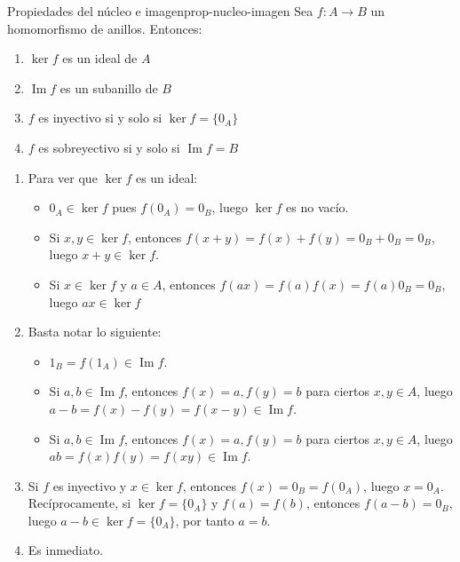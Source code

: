 \begin{proposition}{Propiedades del núcleo e imagen}{prop-nucleo-imagen}
    Sea \(f: A \to B\) un homomorfismo de anillos. Entonces:
    \begin{enumerate}
        \item \(\ker f\) es un ideal de \(A\)
        \item \(\operatorname{Im} f\) es un subanillo de \(B\)
        \item \(f\) es inyectivo si y solo si \(\ker f = \{0_A\}\)
        \item \(f\) es sobreyectivo si y solo si \(\operatorname{Im} f = B\)
    \end{enumerate}
\end{proposition}

\begin{proofbox}
    \begin{enumerate}
        \item Para ver que \(\ker f\) es un ideal:
        \begin{itemize}
            \item \(0_A \in \ker f\) pues \(f(0_A) = 0_B\), luego $\ker f$ es no vacío.
            \item Si \(x, y \in \ker f\), entonces \(f(x + y) = f(x) + f(y) = 0_B + 0_B = 0_B\), luego \(x + y \in \ker f\).
            \item Si \(x \in \ker f\) y \(a \in A\), entonces \(f(ax) = f(a)f(x) = f(a) 0_B = 0_B\), luego \(ax \in \ker f\)
        \end{itemize}
        
        \item Basta notar lo siguiente:
        \begin{itemize}
            \item \(1_B = f(1_A) \in \operatorname{Im} f\).
            \item Si \(a, b \in \operatorname{Im} f\), entonces \(f(x) = a, f(y) = b\) para ciertos $x,y \in A$, luego \(a - b = f(x) - f(y) = f(x - y) \in \operatorname{Im} f\).
            \item Si \(a, b \in \operatorname{Im} f\), entonces \(f(x) = a, f(y) = b\) para ciertos $x,y \in A$, luego \(ab = f(x)f(y) = f(xy) \in \operatorname{Im} f\).
        \end{itemize}

        \item Si \(f\) es inyectivo y \(x \in \ker f\), entonces \(f(x) = 0_B = f(0_A)\), luego \(x = 0_A\). Recíprocamente, si \(\ker f = \{0_A\}\) y \(f(a) = f(b)\), entonces \(f(a - b) = 0_B\), luego \(a - b \in \ker f = \{0_A\}\), por tanto \(a = b\).

        \item Es inmediato.
    \end{enumerate}
\end{proofbox}

